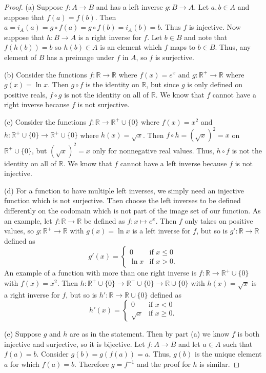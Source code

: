 \documentclass{article}
\begin{document}
\begin{proof}
(a) Suppose $f : A \to B$ and has a left inverse $g : B \to A$. Let $a, b \in A$ and suppose that $f(a) = f(b)$. Then $a = i_A(a) = g \circ f(a) = g \circ f(b) = i_A(b) = b$. Thus $f$ is injective. Now suppose that $h : B \to A$ is a right inverse for $f$. Let $b \in B$ and note that $f(h(b)) = b$ so $h(b) \in A$ is an element which $f$ maps to $b \in B$. Thus, any element of $B$ has a preimage under $f$ in $A$, so $f$ is surjective.

(b) Consider the functions $f : \mathbb{R} \to \mathbb{R}$ where $f(x) = e^x$ and $g : \mathbb{R}^+ \to \mathbb{R}$ where $g(x) = \ln x$. Then $g \circ f$ is the identity on $\mathbb{R}$, but since $g$ is only defined on positive reals, $f \circ g$ is not the identity on all of $\mathbb{R}$. We know that $f$ cannot have a right inverse because $f$ is not surjective.

(c) Consider the functions $f : \mathbb{R} \to \mathbb{R}^+ \cup \{0\}$ where $f(x) = x^2$ and $h : \mathbb{R}^+ \cup \{0\} \to \mathbb{R}^+ \cup \{0\}$ where $h(x) = \sqrt{x}$. Then $f \circ h = (\sqrt{x})^2 = x$ on $\mathbb{R}^+ \cup \{0\}$, but $(\sqrt{x})^2 = x$ only for nonnegative real values. Thus, $h \circ f$ is not the identity on all of $\mathbb{R}$. We know that $f$ cannot have a left inverse because $f$ is not injective.

(d) For a function to have multiple left inverses, we simply need an injective function which is not surjective. Then choose the left inverses to be defined differently on the codomain which is not part of the image set of our function. As an example, let $f : \mathbb{R} \to \mathbb{R}$ be defined as $f : x \mapsto e^x$. Then $f$ only takes on positive values, so $g : \mathbb{R}^+ \to \mathbb{R}$ with $g(x) = \ln x$ is a left inverse for $f$, but so is $g' : \mathbb{R} \to \mathbb{R}$ defined as
\[
g'(x) =
\begin{cases}
0 & \text{if $x \leq 0$}\\
\ln x & \text{if $x > 0$}.
\end{cases}
\]
An example of a function with more than one right inverse is $f : \mathbb{R} \to \mathbb{R}^+ \cup \{0\}$ with $f(x) = x^2$. Then $h : \mathbb{R}^+ \cup \{0\} \to \mathbb{R}^+ \cup \{0\} \to \mathbb{R} \cup \{0\}$ with $h(x) = \sqrt{x}$ is a right inverse for $f$, but so is $h' : \mathbb{R} \to \mathbb{R} \cup \{0\}$ defined as
\[
h'(x) =
\begin{cases}
0 & \text{if $x < 0$}\\
\sqrt{x} & \text{if $x \geq 0$}.
\end{cases}
\]

(e) Suppose $g$ and $h$ are as in the statement. Then by part (a) we know $f$ is both injective and surjective, so it is bijective. Let $f : A \to B$ and let $a \in A$ such that $f(a) = b$. Consider $g(b) = g(f(a)) = a$. Thus, $g(b)$ is the unique element $a$ for which $f(a) = b$. Therefore $g = f^{-1}$ and the proof for $h$ is similar.
\end{proof}
\end{document}
